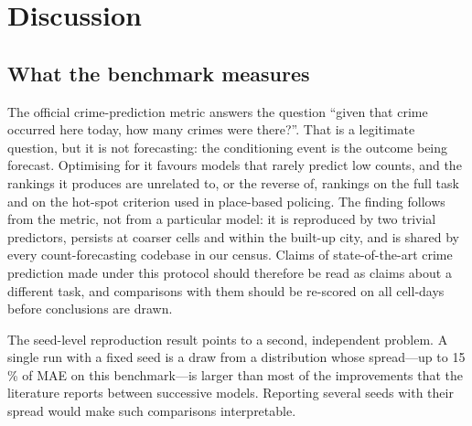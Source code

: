 \documentclass[preprint,12pt,authoryear]{elsarticle}
\begin{document}


\section{Discussion}\label{sec:discussion}

\subsection{What the benchmark measures}
The official crime-prediction metric answers the question ``given that crime occurred here today, how many crimes were there?''. That is a legitimate question, but it is not forecasting: the conditioning event is the outcome being forecast. Optimising for it favours models that rarely predict low counts, and the rankings it produces are unrelated to, or the reverse of, rankings on the full task and on the hot-spot criterion used in place-based policing. The finding follows from the metric, not from a particular model: it is reproduced by two trivial predictors, persists at coarser cells and within the built-up city, and is shared by every count-forecasting codebase in our census. Claims of state-of-the-art crime prediction made under this protocol should therefore be read as claims about a different task, and comparisons with them should be re-scored on all cell-days before conclusions are drawn.

The seed-level reproduction result points to a second, independent problem. A single run with a fixed seed is a draw from a distribution whose spread---up to 15\,\% of MAE on this benchmark---is larger than most of the improvements that the literature reports between successive models. Reporting several seeds with their spread would make such comparisons interpretable.
\end{document}
